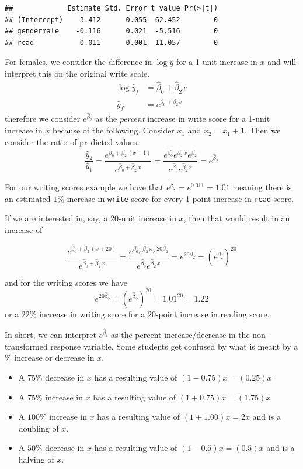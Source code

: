 \documentclass[]{book}
\providecommand{\tightlist}{%
  \setlength{\itemsep}{0pt}\setlength{\parskip}{0pt}}
\theoremstyle{definition}
\theoremstyle{definition}
\theoremstyle{remark}
\begin{document}
\begin{verbatim}
##             Estimate Std. Error t value Pr(>|t|)
## (Intercept)    3.412      0.055  62.452        0
## gendermale    -0.116      0.021  -5.516        0
## read           0.011      0.001  11.057        0
\end{verbatim}

For females, we consider the difference in \(\log\hat{y}\) for a 1-unit
increase in \(x\) and will interpret this on the original write scale.
\[\begin{aligned}
\log\hat{y}_f   &=  \hat{\beta}_{0}+\hat{\beta}_{2}x \\
\hat{y}_f       &=  e^{\hat{\beta}_{0}+\hat{\beta}_{2}x}
\end{aligned}\] therefore we consider \(e^{\hat{\beta}_{2}}\) as the
\emph{percent} increase in write score for a 1-unit increase in \(x\)
because of the following. Consider \(x_1\) and \(x_2 = x_1 +1\). Then we
consider the ratio of predicted values: \[
\frac{\hat{y}_2}{\hat{y}_1} 
  = \frac{e^{\hat{\beta}_{0}+\hat{\beta}_{2}\,\left(x+1\right)}}{e^{\hat{\beta}_{0}+\hat{\beta}_{2}\,x}} 
  = \frac{e^{\hat{\beta}_{0}}e^{\hat{\beta}_{2}\,x}e^{\hat{\beta}_{2}}}{e^{\hat{\beta}_{0}}e^{\hat{\beta}_{2}\,x}} 
  = e^{\hat{\beta}_{2}}\]

For our writing scores example we have that
\(e^{\hat{\beta}_{2}}=e^{0.011}=1.01\) meaning there is an estimated
\(1\%\) increase in \texttt{write} score for every 1-point increase in
\texttt{read} score.

If we are interested in, say, a 20-unit increase in \(x\), then that
would result in an increase of

\[\frac{e^{\hat{\beta}_{0} + \hat{\beta}_{2} \, \left(x+20\right)}} {e^{\hat{\beta}_{0}+\hat{\beta}_{2} \, x}}
 =\frac{e^{\hat{\beta}_{0}} e^{\hat{\beta}_{2}\,x} e^{20\hat{\beta}_{2}}}{e^{\hat{\beta}_{0}} e^{\hat{\beta}_{2} \, x}}
 = e^{20\hat{\beta}_{2}} = \left( e^{\hat{\beta}_{2}} \right)^{20}\]

and for the writing scores we have
\[e^{20\hat{\beta}_{2}} = \left( e^{\hat{\beta}_{2}} \right)^{20}=1.01^{20} = 1.22\]
or a 22\% increase in writing score for a 20-point increase in reading
score.

In short, we can interpret \(e^{\hat{\beta}_{i}}\) as the percent
increase/decrease in the non-transformed response variable. Some
students get confused by what is meant by a \(\%\) increase or decrease
in \(x\).

\begin{itemize}
\tightlist
\item
  A \(75\%\) decrease in \(x\) has a resulting value of
  \(\left(1-0.75\right)x=\left(0.25\right) x\)
\item
  A \(75\%\) increase in \(x\) has a resulting value of
  \(\left(1+0.75\right)x=\left(1.75\right) x\)
\item
  A \(100\%\) increase in \(x\) has a resulting value of
  \(\left(1+1.00\right)x=2x\) and is a doubling of \(x\).
\item
  A \(50\%\) decrease in \(x\) has a resulting value of
  \(\left(1-0.5\right)x=\left(0.5\right) x\) and is a halving of \(x\).
\end{itemize}
\end{document}
